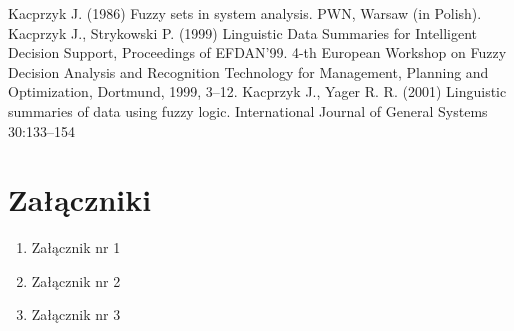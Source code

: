 \documentclass[12pt]{report}
\begin{document}
\begin{thebibliography}{99}
Kacprzyk J. (1986) Fuzzy sets in system analysis.  PWN, Warsaw (in Polish). %
Kacprzyk J., Strykowski P. (1999) Linguistic Data Summaries for Intelligent Decision Support, Proceedings of EFDAN'99. 4-th European Workshop on Fuzzy Decision Analysis and Recognition Technology for Management, Planning and Optimization, Dortmund, 1999, 3--12.
Kacprzyk J., Yager R. R. (2001) Linguistic summaries of data using fuzzy logic. International Journal of General Systems 30:133--154 

\end{thebibliography}

\listoffigures

\listoftables


\chapter*{Załączniki}
\begin{enumerate}
\item Załącznik nr 1
\item Załącznik nr 2
\item Załącznik nr 3
\end{enumerate}

\end{document}
